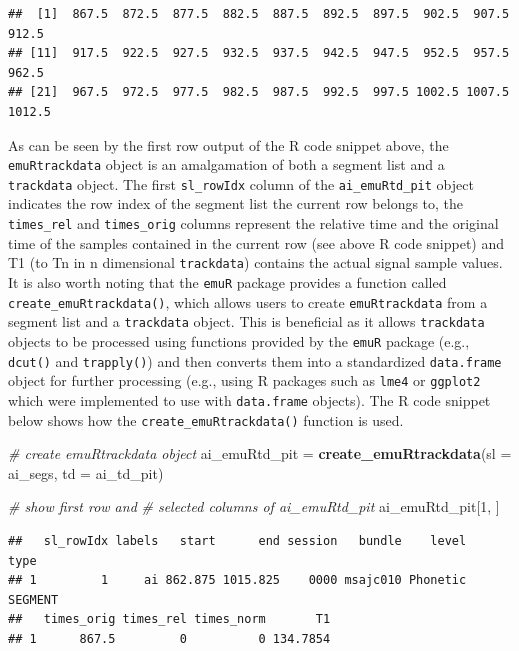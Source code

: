\documentclass[]{book}
\newenvironment{Shaded}{\begin{snugshade}}{\end{snugshade}}
\newcommand{\CommentTok}[1]{\textcolor[rgb]{0.56,0.35,0.01}{\textit{#1}}}
\newcommand{\DataTypeTok}[1]{\textcolor[rgb]{0.13,0.29,0.53}{#1}}
\newcommand{\DecValTok}[1]{\textcolor[rgb]{0.00,0.00,0.81}{#1}}
\newcommand{\KeywordTok}[1]{\textcolor[rgb]{0.13,0.29,0.53}{\textbf{#1}}}
\newcommand{\NormalTok}[1]{#1}
\newcommand{\StringTok}[1]{\textcolor[rgb]{0.31,0.60,0.02}{#1}}
\theoremstyle{definition}
\theoremstyle{definition}
\theoremstyle{definition}
\theoremstyle{remark}
\begin{document}
\begin{verbatim}
##  [1]  867.5  872.5  877.5  882.5  887.5  892.5  897.5  902.5  907.5  912.5
## [11]  917.5  922.5  927.5  932.5  937.5  942.5  947.5  952.5  957.5  962.5
## [21]  967.5  972.5  977.5  982.5  987.5  992.5  997.5 1002.5 1007.5 1012.5
\end{verbatim}

As can be seen by the first row output of the R code snippet above, the
\texttt{emuRtrackdata} object is an amalgamation of both a segment list
and a \texttt{trackdata} object. The first \texttt{sl\_rowIdx} column of
the \texttt{ai\_emuRtd\_pit} object indicates the row index of the
segment list the current row belongs to, the \texttt{times\_rel} and
\texttt{times\_orig} columns represent the relative time and the
original time of the samples contained in the current row (see above R
code snippet) and T1 (to Tn in n dimensional \texttt{trackdata})
contains the actual signal sample values. It is also worth noting that
the \texttt{emuR} package provides a function called
\texttt{create\_emuRtrackdata()}, which allows users to create
\texttt{emuRtrackdata} from a segment list and a \texttt{trackdata}
object. This is beneficial as it allows \texttt{trackdata} objects to be
processed using functions provided by the \texttt{emuR} package (e.g.,
\texttt{dcut()} and \texttt{trapply()}) and then converts them into a
standardized \texttt{data.frame} object for further processing (e.g.,
using R packages such as \texttt{lme4} or \texttt{ggplot2} which were
implemented to use with \texttt{data.frame} objects). The R code snippet
below shows how the \texttt{create\_emuRtrackdata()} function is used.

\begin{Shaded}
\begin{Highlighting}[]
\CommentTok{# create emuRtrackdata object}
\NormalTok{ai_emuRtd_pit  =}\StringTok{ }\KeywordTok{create_emuRtrackdata}\NormalTok{(}\DataTypeTok{sl =}\NormalTok{ ai_segs,}
                                      \DataTypeTok{td =}\NormalTok{ ai_td_pit)}

\CommentTok{# show first row and}
\CommentTok{# selected columns of ai_emuRtd_pit}
\NormalTok{ai_emuRtd_pit[}\DecValTok{1}\NormalTok{, ]}
\end{Highlighting}
\end{Shaded}

\begin{verbatim}
##   sl_rowIdx labels   start      end session   bundle    level    type
## 1         1     ai 862.875 1015.825    0000 msajc010 Phonetic SEGMENT
##   times_orig times_rel times_norm       T1
## 1      867.5         0          0 134.7854
\end{verbatim}
\end{document}
